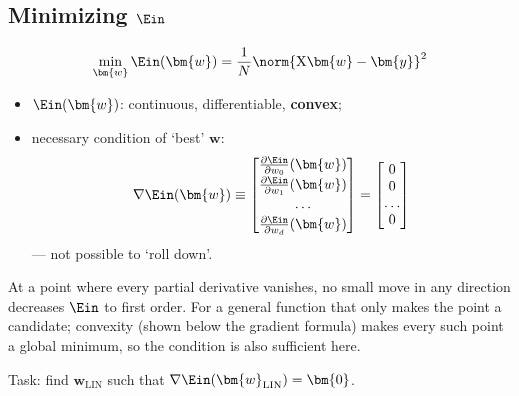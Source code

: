 \subsection{Minimizing \texorpdfstring{\(\Ein\)}{Ein}}

\[
    \min_{\bm{w}} \Ein(\bm{w}) = \frac{1}{N} \norm{\mathrm{X} \bm{w} -
    \bm{y}}^2
\]

\begin{center}
    \begin{minipage}[c]{0.3\textwidth}
        \centering
    \end{minipage}%
    \begin{minipage}[c]{0.66\textwidth}
        \begin{itemize}
            \item \(\Ein(\bm{w})\): continuous, differentiable,
                \textbf{convex};
            \item necessary condition of `best' \(\bm{w}\):
            \[
                \nabla \Ein(\bm{w}) \equiv
                \begin{bmatrix}
                    \frac{\partial \Ein}{\partial w_0}(\bm{w})\\[2pt]
                    \frac{\partial \Ein}{\partial w_1}(\bm{w})\\[2pt]
                    \dots\\[2pt]
                    \frac{\partial \Ein}{\partial w_d}(\bm{w})
                \end{bmatrix}
                =
                \begin{bmatrix} 0\\ 0\\ \dots\\ 0 \end{bmatrix}
            \]
            --- not possible to `roll down'.
        \end{itemize}
    \end{minipage}
\end{center}

At a point where every partial derivative vanishes, no small move in any
direction decreases \(\Ein\) to first order. For a general function that only
makes the point a candidate; convexity (shown below the gradient formula) makes
every such point a global minimum, so the condition is also sufficient here.

\begin{moral}
    Task: find \(\bm{w}_{\mathrm{LIN}}\) such that \(\nabla
    \Ein(\bm{w}_{\mathrm{LIN}}) = \bm{0}\).
\end{moral}

